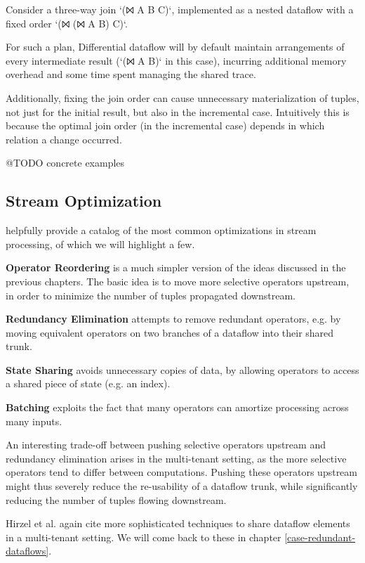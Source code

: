 \documentclass[../index.tex]{subfiles}
\begin{document}
Consider a three-way join `(⨝ A B C)`, implemented as a nested
dataflow with a fixed order `(⨝ (⨝ A B) C)`. 

For such a plan, Differential dataflow will by default maintain
arrangements of every intermediate result (`(⨝ A B)` in this case),
incurring additional memory overhead and some time spent managing the
shared trace.

Additionally, fixing the join order can cause unnecessary
materialization of tuples, not just for the initial result, but also
in the incremental case. Intuitively this is because the optimal join
order (in the incremental case) depends in which relation a change
occurred.

@TODO concrete examples


\subsection{Stream Optimization}

\cite{hirzel2014catalog} helpfully provide a catalog of the most
common optimizations in stream processing, of which we will highlight
a few.

\textbf{Operator Reordering} is a much simpler version of the ideas
discussed in the previous chapters. The basic idea is to move more
selective operators upstream, in order to minimize the number of
tuples propagated downstream.

\textbf{Redundancy Elimination} attempts to remove redundant operators,
e.g. by moving equivalent operators on two branches of a dataflow into
their shared trunk.

\textbf{State Sharing} avoids unnecessary copies of data, by allowing
operators to access a shared piece of state (e.g. an index).

\textbf{Batching} exploits the fact that many operators can amortize
processing across many inputs.

An interesting trade-off between pushing selective operators upstream
and redundancy elimination arises in the multi-tenant setting, as the
more selective operators tend to differ between computations. Pushing
these operators upstream might thus severely reduce the re-usability
of a dataflow trunk, while significantly reducing the number of tuples
flowing downstream. 

Hirzel et al. again cite more sophisticated techniques to share
dataflow elements in a multi-tenant setting. We will come back to
these in chapter \ref{case-redundant-dataflows}.
\end{document}
